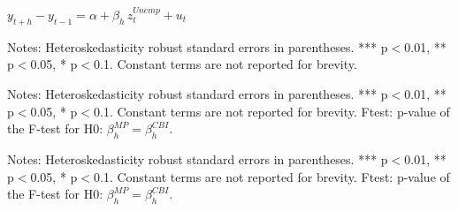 \documentclass[a4paper,12pt]{article}
\newcommand{\pathTables}{../workm_lp/}
\begin{document}
\begin{table}[!htbp]
\begin{center}
\caption{The effect of euro area unemployment rate surprises on financial variables}\label{tab: lp z ea unemp}
$y^{}_{t+h}-y^{}_{t-1} = \alpha + \beta_h\, z^{Unemp}_t + u_t$
\small
{}
\end{center}\footnotesize
Notes: Heteroskedasticity robust standard errors in parentheses. *** p$<$0.01, ** p$<$0.05, * p$<$0.1.
Constant terms are not reported for brevity.
\end{table}


\begin{table}[!htbp]\small
\begin{center}
\caption{The effect of ECB monetary policy and information shocks on stock sub-indices.}\label{tab: lp ecb shocks stocks}
\end{center}
Notes: Heteroskedasticity robust standard errors in parentheses. *** p$<$0.01, ** p$<$0.05, * p$<$0.1.
Constant terms are not reported for brevity.
Ftest: p-value of the F-test for H0: $\beta^{MP}_h=\beta^{CBI}_h$.
\end{table}

\begin{table}[!htbp]\addtocounter{table}{-1}\small
\begin{center}
\caption{Continued}
\end{center}
Notes: Heteroskedasticity robust standard errors in parentheses. *** p$<$0.01, ** p$<$0.05, * p$<$0.1.
Constant terms are not reported for brevity.
Ftest: p-value of the F-test for H0: $\beta^{MP}_h=\beta^{CBI}_h$.
\end{table}
\end{document}
